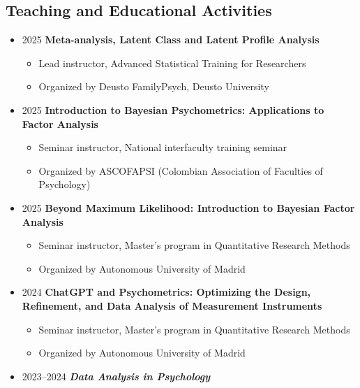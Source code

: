 \documentclass[
  letterpaper,
  DIV=11,
  numbers=noendperiod]{scrartcl}
\providecommand{\tightlist}{%
  \setlength{\itemsep}{0pt}\setlength{\parskip}{0pt}}
\begin{document}
\subsection{\texorpdfstring{ Teaching and Educational
Activities}{ Teaching and Educational Activities}}\label{teaching-and-educational-activities}

\begin{itemize}
\tightlist
\item
  2025 \textbar{} \textbf{Meta-analysis, Latent Class and Latent Profile
  Analysis}

  \begin{itemize}
  \tightlist
  \item
    Lead instructor, Advanced Statistical Training for Researchers\\
  \item
    Organized by Deusto FamilyPsych, Deusto University
  \end{itemize}
\item
  2025 \textbar{} \textbf{Introduction to Bayesian Psychometrics:
  Applications to Factor Analysis}

  \begin{itemize}
  \tightlist
  \item
    Seminar instructor, National interfaculty training seminar\\
  \item
    Organized by ASCOFAPSI (Colombian Association of Faculties of
    Psychology)
  \end{itemize}
\item
  2025 \textbar{} \textbf{Beyond Maximum Likelihood: Introduction to
  Bayesian Factor Analysis}

  \begin{itemize}
  \tightlist
  \item
    Seminar instructor, Master's program in Quantitative Research
    Methods\\
  \item
    Organized by Autonomous University of Madrid
  \end{itemize}
\item
  2024 \textbar{} \textbf{ChatGPT and Psychometrics: Optimizing the
  Design, Refinement, and Data Analysis of Measurement Instruments}

  \begin{itemize}
  \tightlist
  \item
    Seminar instructor, Master's program in Quantitative Research
    Methods\\
  \item
    Organized by Autonomous University of Madrid
  \end{itemize}
\item
  2023--2024 \textbar{} \textbf{\emph{Data Analysis in Psychology}}


\end{itemize}
\end{document}
